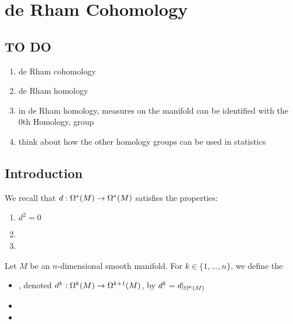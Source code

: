 \documentclass{book}
\begin{document}
\newpage
\chapter{de Rham Cohomology}


\section{TO DO}
\begin{enumerate}
	\item de Rham cohomology
	\item de Rham homology
	\item in de Rham homology, measures on the manifold can be identified with the 0th Homology, group
	\item think about how the other homology groups can be used in statistics
\end{enumerate}


\section{Introduction}

\begin{note}
	We recall that $d: \Omega^*(M) \rightarrow \Omega^*(M)$ satisfies the properties:
	\begin{enumerate}
		\item $d^2 = 0$
		\item 
		\item 
	\end{enumerate}
\end{note}

\begin{defn}
	Let $M$ be an $n$-dimensional smooth manifold. For $k \in  \{1, \ldots, n\}$, we define the
	\begin{itemize}
		 \item {}, denoted $d^k: \Omega^k(M) \rightarrow \Omega^{k+1}(M)$, by $d^k = d|_{\Omega^k(M)}$
		 \item 
		 \item 
	\end{itemize} 
\end{defn}
\end{document}
